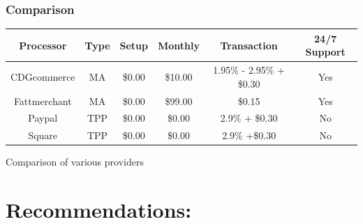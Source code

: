 \documentclass[letterpaper]{article}
\begin{document}
      \subsubsection{Comparison}
        \begin{center}
         \centering
         \begin{tabular}{||c c c c c c||}
         \hline
         Processor & Type & Setup & Monthly & Transaction & 24/7 Support\\ [0.5ex]
         \hline\hline
         CDGcommerce & MA & \$0.00 & \$10.00 & 1.95\% - 2.95\% + \$0.30 & Yes\\
         Fattmerchant & MA & \$0.00 & \$99.00 & \$0.15 & Yes\\
         Paypal & TPP & \$0.00 & \$0.00 & 2.9\% + \$0.30 & No\\
         Square & TPP & \$0.00 & \$0.00 & 2.9\% +\$0.30 & No\\ [1ex]
         \hline
        \end{tabular}
        \caption{Comparison of various providers}
        \label{table:1}
      \end{center}

  \section{Recommendations:}
\end{document}
